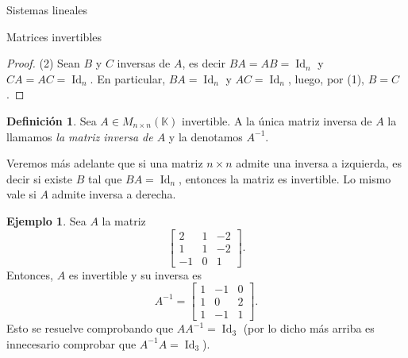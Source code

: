 \documentclass[a4paper,12pt,twoside,spanish,reqno]{amsbook}
\theoremstyle{definition}
\newtheorem{definicion}{Definici\'on}[section]
\newtheorem{ejemplo}{Ejemplo}[section]
\theoremstyle{remark}
\newcommand{\Id}{\operatorname{Id}}
\newcommand{\K}{\mathbb K}
\begin{document}
\begin{chapter}{Sistemas lineales}
\begin{section}{Matrices invertibles}
\begin{proof}
                (2) Sean $B$ y $C$ inversas de $A$, es decir $BA=AB=\Id_n$ y  $CA=AC=\Id_n$. En particular, $BA=\Id_n$ y $AC= \Id_n$, luego, por (1), $B=C$.  
            \end{proof}
            
            
            
            \begin{definicion}
                Sea $A\in M_{n\times n}(\K)$ invertible. A la única matriz inversa de $A$ la llamamos \textit{la matriz inversa de $A$} y la denotamos $A^{-1}$.
            \end{definicion}
            
            Veremos más adelante que si una matriz $n \times n$ admite una inversa a izquierda,  es decir si existe $B$ tal que $BA=\Id_n$, entonces la matriz es invertible. Lo mismo vale si $A$  admite inversa a derecha.
            
            \begin{ejemplo}
                Sea $A$ la matriz 
                \begin{equation*}
                \begin{bmatrix} 2&1&-2\\ 1&1&-2\\ -1&0&1
                \end{bmatrix}.
                \end{equation*}
                Entonces,  $A$ es invertible y su inversa es
                \begin{equation*}
                A^{-1} = \begin{bmatrix} 1&-1&0\\ 1&0&2\\ 1&-1&1
                \end{bmatrix}.
                \end{equation*}
                Esto se resuelve comprobando que $AA^{-1}=\Id_3$ (por lo dicho más arriba es innecesario comprobar que $A^{-1}A=\Id_3$).
            \end{ejemplo} 
            

\end{section}
\end{chapter}
\end{document}
